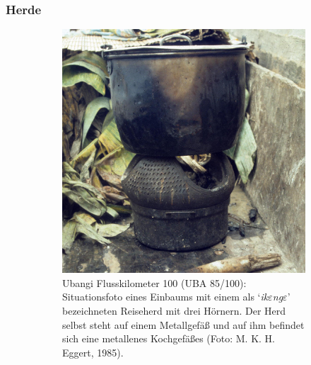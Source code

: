 \subsubsection{Herde}\label{sec:Reiseherde}

\begin{figure}[tb]
\centering
\begin{subfigure}[t]{\columnwidth}
 \centering
 \includegraphics[width=\textwidth]{fig/UBA85-100_Ubangi-km100_12-08-85.jpg}
 \caption{\mbox{Ubangi} Flusskilometer 100 (UBA 85/100): Situationsfoto eines Einbaums mit einem als \enquote*{\textit{ik$\varepsilon$ng$\varepsilon$}} bezeichneten Reiseherd mit drei Hörnern. Der Herd selbst steht auf einem Metallgefäß und auf ihm befindet sich eine metallenes Kochgefäßes (Foto: M. K. H. Eggert, 1985).}
 \label{fig:Reiseherd_A}
\end{subfigure}\hfill
\begin{subfigure}[t]{\columnwidth}	
 \centering

\end{subfigure}
\end{figure}
